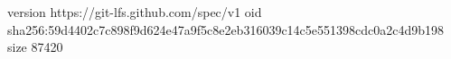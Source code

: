 version https://git-lfs.github.com/spec/v1
oid sha256:59d4402c7c898f9d624e47a9f5c8e2eb316039c14c5e551398cdc0a2c4d9b198
size 87420
